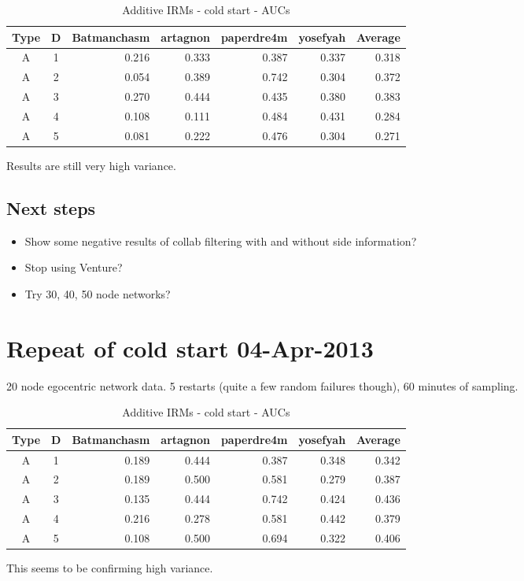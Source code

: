 \documentclass[twoside,11pt]{article}
\begin{document}
\begin{table*}[ht!]
\caption{{\small
Additive IRMs - cold start - AUCs
}}
\label{tbl:IRM 04-Apr-2013}
\begin{center}
\begin{tabular}{c c | r r r r | r}
Type & D & Batmanchasm & artagnon & paperdre4m & yosefyah & Average \\
\hline
A & 1 & 0.216 & 0.333 & 0.387 & 0.337 & 0.318\\
A & 2 & 0.054 & 0.389 & 0.742 & 0.304 & 0.372\\
A & 3 & 0.270 & 0.444 & 0.435 & 0.380 & 0.383\\
A & 4 & 0.108 & 0.111 & 0.484 & 0.431 & 0.284\\
A & 5 & 0.081 & 0.222 & 0.476 & 0.304 & 0.271
\end{tabular}
\end{center}
\end{table*}

Results are still very high variance.

\subsection{Next steps}

\begin{itemize}
\item Show some negative results of \eg collab filtering with and without side information?
\item Stop using Venture?
\item Try 30, 40, 50 node networks?
\end{itemize}

\section{Repeat of cold start 04-Apr-2013}

20 node egocentric network data.
5 restarts (quite a few random failures though), 60 minutes of sampling.

\begin{table*}[ht!]
\caption{{\small
Additive IRMs - cold start - AUCs
}}
\label{tbl:IRM 04-Apr-2013v02}
\begin{center}
\begin{tabular}{c c | r r r r | r}
Type & D & Batmanchasm & artagnon & paperdre4m & yosefyah & Average \\
\hline
A & 1 & 0.189 & 0.444 & 0.387 & 0.348 & 0.342\\
A & 2 & 0.189 & 0.500 & 0.581 & 0.279 & 0.387\\
A & 3 & 0.135 & 0.444 & 0.742 & 0.424 & 0.436\\
A & 4 & 0.216 & 0.278 & 0.581 & 0.442 & 0.379\\
A & 5 & 0.108 & 0.500 & 0.694 & 0.322 & 0.406
\end{tabular}
\end{center}
\end{table*}

This seems to be confirming high variance.

\newpage


\vskip 0.2in

\end{document}
